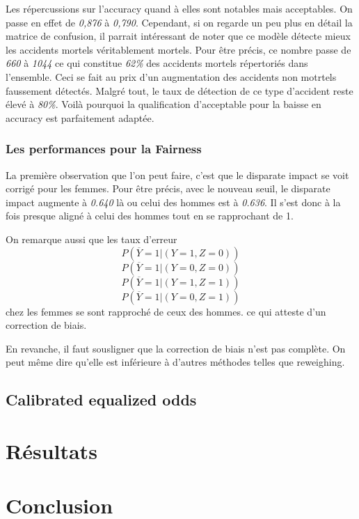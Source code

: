 \documentclass{article}
\begin{document}
    Les répercussions sur l'accuracy quand à elles sont notables mais acceptables. On passe en effet de \textit{0,876} à \textit{0,790}.
    Cependant, si on regarde un peu plus en détail la matrice de confusion, il parrait intéressant de noter que ce modèle détecte mieux 
    les accidents mortels véritablement mortels. Pour être précis, ce nombre passe de \textit{660} à \textit{1044} ce qui constitue  \textit{62\%} des accidents
    mortels répertoriés dans l'ensemble. Ceci se fait au prix d'un augmentation des accidents non motrtels faussement détectés. Malgré tout, 
    le taux de détection de ce type d'accident reste élevé à \textit{80\%}. Voilà pourquoi la qualification d'acceptable pour la baisse en 
    accuracy est parfaitement adaptée.

    \subsubsection{Les performances pour la Fairness}

    La première observation que l'on peut faire, c'est que le disparate impact se voit corrigé pour les femmes. Pour être précis, avec le nouveau seuil, le disparate impact
    augmente à \textit{0.640} là ou celui des hommes est à \textit{0.636}. Il s'est donc à la fois presque aligné à celui des hommes tout en se rapprochant de 1. 
    
    On remarque aussi que les taux d'erreur 
    \[ P(\overline{Y}=1| (Y=1, Z=0)) \] \[ P(\overline{Y}=1| (Y=0, Z=0)) \] \[ P(\overline{Y}=1| (Y=1, Z=1)) \] \[ P(\overline{Y}=1| (Y=0, Z=1)) \] chez les femmes se sont rapproché de
    ceux des hommes. ce qui atteste d'un correction de biais. 

    En revanche, il faut sousligner que la correction de biais n'est pas complète. On peut même dire qu'elle est inférieure à d'autres méthodes telles que reweighing.
    
    \subsection{Calibrated equalized odds}
    
    \section{Résultats}

    \section{Conclusion}
\end{document}

